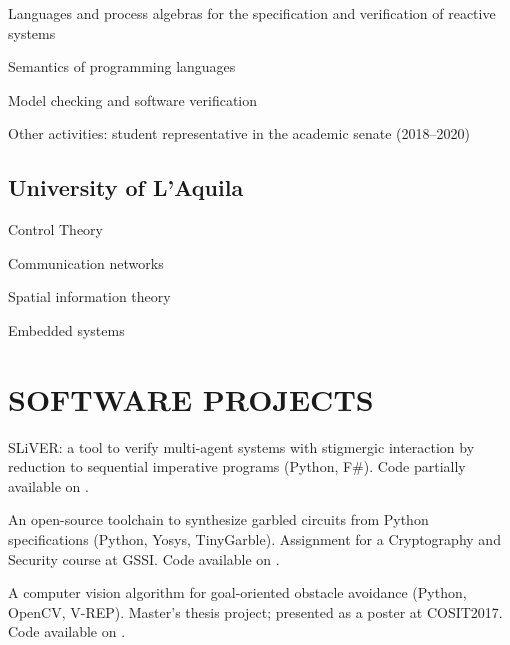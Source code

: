 \documentclass[a4paper]{deedy-resume-openfont}
\begin{document}
\begin{minipage}[t]{0.67\textwidth}
\begin{tightemize}
\item Languages and process algebras for the specification and verification of reactive systems
\item Semantics of programming languages
\item Model checking and software verification
\end{tightemize}
Other activities: student representative in the academic senate (2018--2020)
\sectionsep%

\subsection{University of L'Aquila}
\begin{tightemize}
\item Control Theory
\item Communication networks
\item Spatial information theory
\item Embedded systems
\end{tightemize}
\sectionsep%

\section{SOFTWARE PROJECTS}
\location{\hspace{1em}}

\begin{tightemize}
\item
SLiVER\@: a tool to verify multi-agent systems with stigmergic interaction
by reduction to sequential imperative programs
(Python, F\#).
Code partially available on \href{https://github.com/labs-lang/sliver}{}.

\item 
An open-source toolchain to synthesize garbled circuits from Python specifications (Python, Yosys, TinyGarble).
Assignment for a Cryptography and Security course at GSSI\@.
Code available on \href{https://github.com/lou1306/gssi/blob/master/2pc/}{}.
\item
A computer vision algorithm
for goal-oriented obstacle avoidance (Python, OpenCV, V-REP).
Master's thesis project; presented as a poster at COSIT2017. 
Code available on \href{https://github.com/lou1306/localpathplanner}{}.
\end{tightemize}

\end{minipage} 
\end{document}
